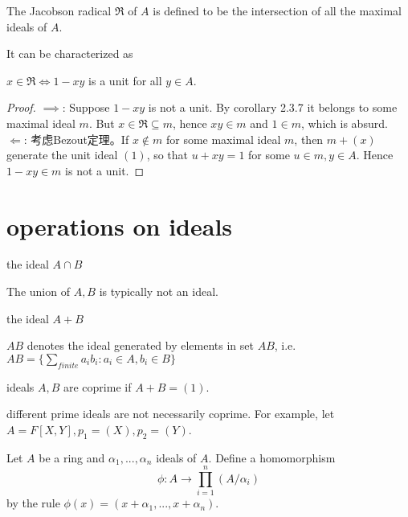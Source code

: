 \documentclass[11pt,fleqn]{book} %
\begin{document}
\begin{CJK}{UTF8}{gkai}
\begin{definition}
	 The Jacobson radical $\mathfrak{R}$ of $A$ is defined to be the intersection of all the maximal ideals of $A$.
\end{definition}
It can be characterized as
\begin{proposition}
	$x\in \mathfrak{R} \iff 1 - xy$ is a unit for all $y \in A$.
\end{proposition}
\begin{proof}
	$\implies$: Suppose $1-xy$ is not a unit. By corollary 2.3.7 it belongs to some maximal ideal $m$. But $x\in \mathfrak{R}\subseteq m$, hence $xy \in m$ and $1 \in m$, which is absurd. \\
	$\Leftarrow$: 考虑Bezout定理。If $x\notin m$ for some maximal ideal $m$, then $m + (x)$ generate the unit ideal $(1)$, so that $u + xy = 1$ for some $u \in m, y \in A$. Hence $1 - xy \in m$ is not a unit.
\end{proof}

\section{operations on ideals}
\begin{definition}
	[intersection] the ideal $A \cap B$
\end{definition}
\begin{remark}
	The union of $A, B$ is typically not an ideal.
\end{remark}

\begin{definition}
	[sum] the ideal $A + B$
\end{definition}

\begin{definition}
	[product] $AB$ denotes the ideal generated by elements in set $AB$, i.e. $AB = \{\sum_{finite}a_ib_i : a_i \in A, b_i \in B\}$	
\end{definition}

\begin{definition}
	[coprime] ideals $A,B$ are coprime if $A + B = (1)$.
\end{definition}
\begin{remark}
	different prime ideals are not necessarily coprime. For example, let $A = F[X, Y], p_1 = (X), p_2 = (Y)$.	
\end{remark}

\begin{definition}
	Let $A$ be a ring and $\alpha_1, ... ,\alpha_n$ ideals of $A$. Define a homomorphism
\[\phi: A \to \prod_{i=1}^n(A/\alpha_i)\]
by the rule $\phi(x) = (x+\alpha_1,...,x+\alpha_n)$.


\end{definition}
\end{CJK}
\end{document}
